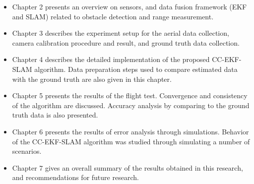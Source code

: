 \begin{itemize}
  \item Chapter 2 presents an overview on sensors, and data fusion
  framework (EKF and SLAM) related to obstacle detection and range
  measurement.
  \item Chapter 3 describes the experiment setup for the aerial data
  collection, camera calibration procedure and result, and ground
  truth data collection.
  \item Chapter 4 describes the detailed implementation of the proposed
  CC-EKF-SLAM algorithm. Data preparation steps used to compare
  estimated data with the ground truth are also given in this chapter.
  \item Chapter 5 presents the results of the flight test. Convergence and
  consistency of the algorithm are discussed. Accuracy analysis by
  comparing to the ground truth data is also presented.
  \item Chapter 6 presents the results of error analysis through
  simulations. Behavior of the CC-EKF-SLAM
  algorithm was studied through simulating a number of scenarios.
  \item Chapter 7 gives an overall summary of the results obtained in
  this research, and recommendations for future research.
\end{itemize}

